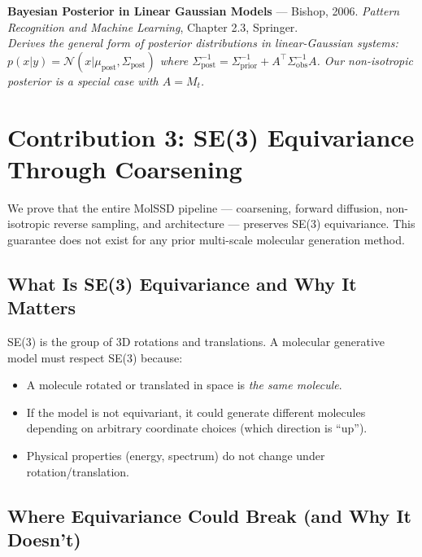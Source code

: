 \documentclass[12pt,a4paper]{article}
\begin{document}
\begin{enumerate}[leftmargin=*, label={[\arabic*]}]
\item \textbf{Bayesian Posterior in Linear Gaussian Models} --- Bishop, 2006.
\textit{Pattern Recognition and Machine Learning}, Chapter 2.3, Springer.\\
\emph{Derives the general form of posterior distributions in linear-Gaussian systems: $p(x|y) = \mathcal{N}(x | \mu_{\text{post}}, \Sigma_{\text{post}})$ where $\Sigma_{\text{post}}^{-1} = \Sigma_{\text{prior}}^{-1} + A^\top \Sigma_{\text{obs}}^{-1} A$. Our non-isotropic posterior is a special case with $A = M_t$.}

\end{enumerate}


\section{Contribution 3: SE(3) Equivariance Through Coarsening}

\begin{noveltybox}
We prove that the entire MolSSD pipeline --- coarsening, forward diffusion, non-isotropic reverse sampling, and architecture --- preserves SE(3) equivariance. This guarantee does not exist for any prior multi-scale molecular generation method.
\end{noveltybox}

\subsection{What Is SE(3) Equivariance and Why It Matters}

SE(3) is the group of 3D rotations and translations. A molecular generative model must respect SE(3) because:
\begin{itemize}
  \item A molecule rotated or translated in space is \emph{the same molecule}.
  \item If the model is not equivariant, it could generate different molecules depending on arbitrary coordinate choices (which direction is ``up'').
  \item Physical properties (energy, spectrum) do not change under rotation/translation.
\end{itemize}

\subsection{Where Equivariance Could Break (and Why It Doesn't)}
\end{document}
